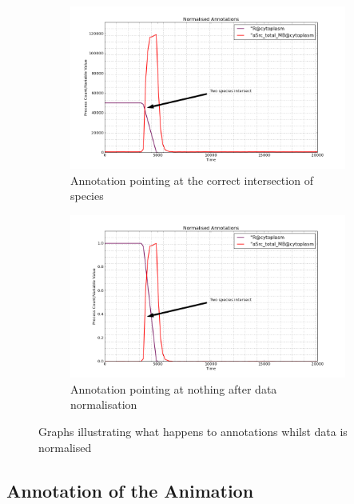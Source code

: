 \begin{figure}[h!]
    \centering
    \begin{subfigure}[b]{0.6\textwidth}
        \centering
        \includegraphics[width=\textwidth]{images/unnormalised_annotation.png}
        \caption{Annotation pointing at the correct intersection of species}
        \label{fig:annotation_instersection_a}
    \end{subfigure}

    \begin{subfigure}[b]{0.6\textwidth}
        \centering
        \includegraphics[width=\textwidth]{images/normalised_annotation.png}
        \caption{Annotation pointing at nothing after data normalisation}
        \label{fig:annotation_intersection_b}
    \end{subfigure}
    \caption{Graphs illustrating what happens to annotations whilst data is normalised}
    \label{fig:annotation_intersection}
\end{figure}

\subsection{Annotation of the Animation}
\label{sec:anime_annotation}

